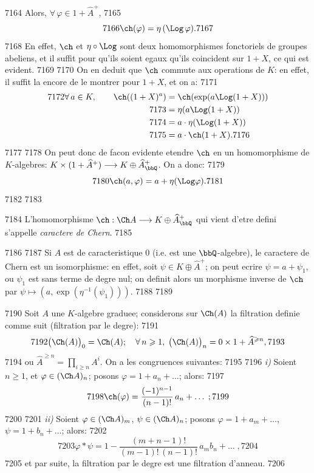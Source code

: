   7164	Alors, $\forall\, \varphi \in 1 + \widehat{A}^+$,
  7165	\begin{equation}\label{eq:6.3.2}
  7166	\ch(\varphi) = \eta\,(\Log\, \varphi).
  7167	\end{equation}
  7168	En effet, $\ch$ et $\eta \circ \Log$ sont deux homomorphismes fonctoriels de groupes abeliens, et il suffit pour qu'ils soient egaux qu'ils coincident sur $1+X$, ce qui est evident.
  7169	
  7170	On en deduit que $\ch$ commute aux operations de $K$: en effet, il suffit la encore de le montrer pour $1+X$, et on a:
  7171	\begin{align*}
  7172	\forall\, a \in K, \qquad \ch((1+X)^a) &= \ch(\exp(a \Log(1+X))) \\
  7173	&= \eta(a \Log(1+X)) \\
  7174	&= a \cdot \eta(\Log(1+X)) \\
  7175	&= a \cdot \ch(1+X).
  7176	\end{align*}
  7177	
  7178	On peut donc de facon evidente etendre $\ch$ en un homomorphisme de $K$-algebres: $K \times (1 + \widehat{A}^+) \longrightarrow K \oplus \widehat{A}_{\bbQ}^+$. On a donc:
  7179	\begin{equation}\label{eq:6.3.3}
  7180	\ch(a, \varphi) = a + \eta(\Log \varphi).
  7181	\end{equation}
  7182	
  7183	\begin{dfn}
  7184	L'homomorphisme $\ch : \Ch A \longrightarrow K \oplus \widehat{A}_{\bbQ}^+$ qui vient d'etre defini s'appelle \emph{caractere de Chern}.
  7185	\end{dfn}
  7186	
  7187	Si $A$ est de caracteristique $0$ (i.e. est une $\bbQ$-algebre), le caractere de Chern est un isomorphisme: en effet, soit $\psi \in K \oplus \widehat{A}^+$; on peut ecrire $\psi = a + \psi_1$, ou $\psi_1$ est sans terme de degre nul; on definit alors un morphisme inverse de $\ch$ par $\psi \longmapsto (a, \exp(\eta^{-1}(\psi_1)))$.
  7188	
  7189	\begin{prop}
  7190	Soit $A$ une $K$-algebre graduee; considerons sur $\Ch(A)$ la filtration definie comme suit (filtration par le degre):
  7191	\begin{equation}\label{eq:6.5.1}
  7192	\bigl(\Ch(A)\bigr)_0 = \Ch(A); \quad \forall\, n \geqslant 1,\; \bigl(\Ch(A)\bigr)_n = 0 \times 1 + \widehat{A}^{\geqslant n},
  7193	\end{equation}
  7194	ou $\widehat{A}^{\geqslant n} = \prod_{i \geqslant n} A^i$. On a les congruences suivantes:
  7195	
  7196	\emph{i)} Soient $n \geqslant 1$, et $\varphi \in (\Ch A)_n$; posons $\varphi = 1 + a_n + \ldots$; alors:
  7197	\begin{equation}\label{eq:6.5.2}
  7198	\ch(\varphi) = \frac{(-1)^{n-1}}{(n-1)!}\, a_n + \ldots\;;
  7199	\end{equation}
  7200	
  7201	\emph{ii)} Soient $\varphi \in (\Ch A)_m$, $\psi \in (\Ch A)_n$; posons $\varphi = 1 + a_m + \ldots$, $\psi = 1 + b_n + \ldots$; alors:
  7202	\begin{equation}\label{eq:6.5.3}
  7203	\varphi * \psi = 1 - \frac{(m+n-1)!}{(m-1)!\,(n-1)!}\, a_m b_n + \ldots\;,
  7204	\end{equation}
  7205	et par suite, la filtration par le degre est une filtration d'anneau.
  7206	\end{prop}
